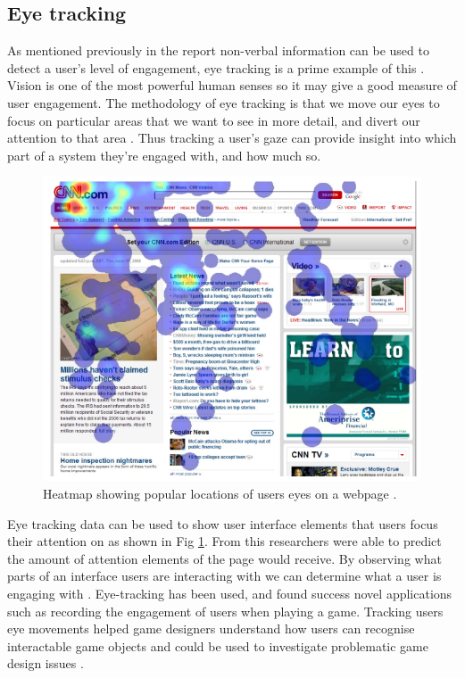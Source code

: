 \documentclass{article}
\begin{document}
\subsection{Eye tracking}

As mentioned previously in the report non-verbal information can be used to detect a
user’s level of engagement, eye tracking is a prime example of this \cite{lala2017detection}.
Vision is one of the most powerful human senses so it may give a good measure of user engagement. 
The methodology of eye tracking is that we move our eyes to focus on particular areas that we want to see in more detail, and divert our attention to that area \cite{duchowski2007eye}. 
Thus tracking a user’s gaze can provide insight into which part of a system they’re engaged with, and how much so.

\begin{figure}[ht!]
    \centering
    \centerline{
        \includegraphics[scale=0.7]{EyeHeatmap.PNG}
    }
    \caption{Heatmap showing popular locations of users eyes on a webpage \cite{buscher2009you}.}
    \label{fig:eyetrack}
\end{figure}

Eye tracking data can be used to show user interface elements that users focus their attention on as shown in Fig \ref{fig:eyetrack}. 
From this researchers were able to predict the amount of attention elements of the page would receive. 
By observing what parts of an interface users are interacting with we can determine what a user is engaging with \cite{buscher2009you}.
Eye-tracking has been used, and found success novel applications such as recording the engagement of users when playing a game. 
Tracking users eye movements helped game designers understand how users can recognise interactable game objects and could be used to investigate problematic game design issues \cite{renshaw2009towards}.
\end{document}
